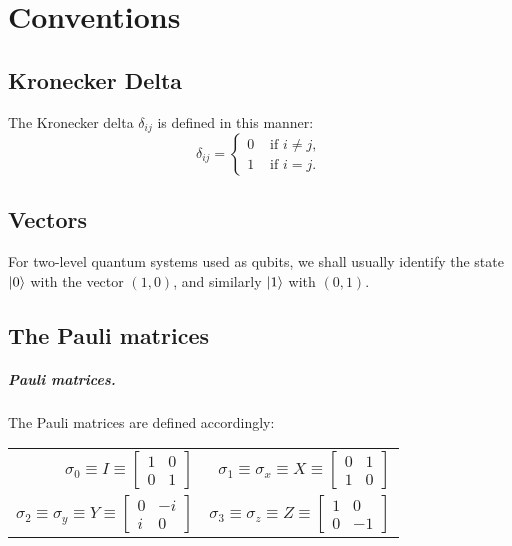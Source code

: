 \chapter{Conventions}

\section{Kronecker Delta}

The Kronecker delta $\delta_{ij}$ is defined in this manner: \begin{equation}
  \delta_{ij} = \begin{cases}
    0 &\text{ if } i \neq j, \\
    1 &\text{ if } i = j.
  \end{cases}
\end{equation}

\section{Vectors}

For two-level quantum systems used as qubits, we shall usually identify the
state $\ket{0}$ with the vector $(1, 0)$, and similarly $\ket{1}$ with $(0,
1)$.

\section{The Pauli matrices}

\paragraph{Pauli matrices.} The Pauli matrices are defined accordingly:

\begin{center}
  \begin{tabular}{r r}
    \addlinespace[1em]
    $\sigma_0 \equiv I \equiv \begin{bmatrix}
      1 & 0 \\
      0 & 1
    \end{bmatrix}$ & $\sigma_1 \equiv \sigma_x \equiv X \equiv \begin{bmatrix}
      0 & 1 \\
      1 & 0
    \end{bmatrix}$ \\
    \addlinespace[1em]
    $\sigma_2 \equiv \sigma_y \equiv Y \equiv \begin{bmatrix}
      0 & -i \\
      i & 0
    \end{bmatrix}$ & $\sigma_3 \equiv \sigma_z \equiv Z \equiv \begin{bmatrix}
      1 & 0 \\
      0 & -1
    \end{bmatrix}$
  \end{tabular}
\end{center}

